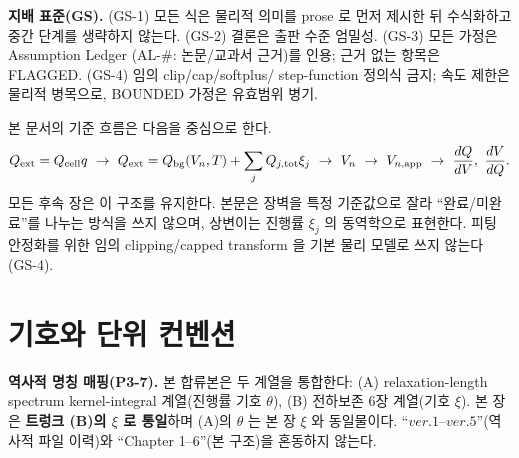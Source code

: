 \begin{groundingbox}
\textbf{지배 표준(GS).} (GS-1) 모든 식은 물리적 의미를 prose 로 먼저 제시한 뒤 수식화하고 중간
단계를 생략하지 않는다. (GS-2) 결론은 출판 수준 엄밀성. (GS-3) 모든 가정은 Assumption Ledger
(AL-\#: 논문/교과서 근거)를 인용; 근거 없는 항목은 FLAGGED. (GS-4) 임의 clip/cap/softplus/
step-function 정의식 금지; 속도 제한은 물리적 병목으로, BOUNDED 가정은 유효범위 병기.
\end{groundingbox}

본 문서의 기준 흐름은 다음을 중심으로 한다.
\begin{equation}
Q_{\mathrm{ext}}=Q_{\mathrm{cell}} q
\ \rightarrow\
Q_{\mathrm{ext}}=Q_{\mathrm{bg}}(V_n,T)+\sum_j Q_{j,\mathrm{tot}}\xi_j
\ \rightarrow\
V_n
\ \rightarrow\
V_{n,\mathrm{app}}
\ \rightarrow\
\frac{dQ}{dV},\ \frac{dV}{dQ}.
\label{eq:masterflow}
\end{equation}
모든 후속 장은 이 구조를 유지한다. 본문은 장벽을 특정 기준값으로 잘라 ``완료/미완료''를 나누는
방식을 쓰지 않으며, 상변이는 진행률 $\xi_j$ 의 동역학으로 표현한다. 피팅 안정화를 위한 임의
clipping/capped transform 을 기본 물리 모델로 쓰지 않는다(GS-4).


\section{기호와 단위 컨벤션}\label{sec:notation}
\textbf{역사적 명칭 매핑(P3-7).} 본 합류본은 두 계열을 통합한다: (A) relaxation-length spectrum
kernel-integral 계열(진행률 기호 $\theta$), (B) 전하보존 6장 계열(기호 $\xi$). 본 장은 \textbf{트렁크
(B)의 $\xi$ 로 통일}하며 (A)의 $\theta$ 는 본 장 $\xi$ 와 동일물이다. ``$ver.1$--$ver.5$''(역사적 파일
이력)와 ``Chapter 1--6''(본 구조)을 혼동하지 않는다.

